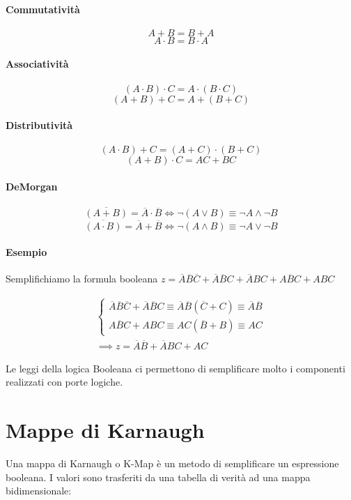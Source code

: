 \paragraph{Commutatività}
\[ A + B = B + A \]
\[ A \cdot B = B \cdot A \]
\paragraph{Associatività}
\[ (A \cdot B) \cdot C = A \cdot (B \cdot C) \]
\[ (A + B) + C = A + (B + C) \]
\paragraph{Distributività}
\[ (A \cdot B) + C = (A+C) \cdot (B+C) \]
\[ (A+B) \cdot C = AC + BC \]
\paragraph{DeMorgan}
\[ \overbar{(A + B)} = \overbar{A} \cdot \overbar{B} \iff \lnot(A \lor B )\equiv \lnot A \land \lnot B \]
\[ \overbar{(A \cdot B)} = \overbar{A} + \overbar{B} \iff \lnot(A \land B )\equiv \lnot A \lor \lnot B \]

\paragraph{Esempio}
Semplifichiamo la formula booleana $ z = \overbar{A}\overbar{B}\overbar{C} + \overbar{A}\overbar{B}C + \overbar{A}BC + A\overbar{B}C + ABC $

\begin{align}
\begin{cases}
\overbar{A}\overbar{B}\overbar{C} + \overbar{A}\overbar{B}C \equiv \overbar{A}\overbar{B}(\overbar{C}+C) \equiv \overbar{A}\overbar{B} \\ 
A\overbar{B}C + ABC \equiv AC(\overbar{B}+B) \equiv AC
\end{cases} \\
\implies z = \overbar{A}\overbar{B} + \overbar{A}BC + AC
\end{align}

Le leggi della logica Booleana ci permettono di semplificare molto i componenti realizzati con porte logiche.

\section{Mappe di Karnaugh}

Una mappa di Karnaugh o K-Map è un metodo di semplificare un espressione booleana. I valori sono trasferiti da una tabella di verità ad una mappa bidimensionale:

